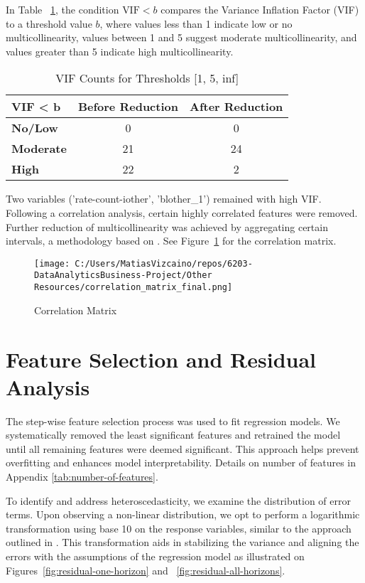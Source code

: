 \documentclass{article}
\begin{document}
In Table ~\ref{fig:VIF-analysis}, the condition \( \text{VIF} < b \) compares the Variance Inflation Factor (VIF) to a threshold value \( b \), where values less than 1 indicate low or no multicollinearity, values between 1 and 5 suggest moderate multicollinearity, and values greater than 5 indicate high multicollinearity.

\begin{table}[h]
\centering
\begin{tabular}{lcc}
\hline
 VIF \textless{} b & \textbf{Before Reduction} & \textbf{After Reduction} \\
\hline
\textbf{No/Low} & 0 & 0 \\
\textbf{Moderate} & 21 & 24 \\
\textbf{High} & 22 & 2 \\
\hline
\end{tabular}
\caption{VIF Counts for Thresholds [1, 5, inf]}
\label{fig:VIF-analysis}
\end{table}

Two variables ('rate-count-iother', 'blother\_1') remained with high VIF. Following a correlation analysis, certain highly correlated features were removed. Further reduction of multicollinearity was achieved by aggregating certain intervals, a methodology based on \cite{Miori2023}. See Figure~\ref{fig:correlation-matrix} for the correlation matrix.

\begin{figure}[htbp]
  \centering
  \texttt{[image: C:/Users/MatiasVizcaino/repos/6203-DataAnalyticsBusiness-Project/Other Resources/correlation\_matrix\_final.png]}
  \caption{Correlation Matrix}
  \label{fig:correlation-matrix}
\end{figure}

\section{\textbf{Feature Selection and Residual Analysis}}

The step-wise feature selection process was used to fit regression models. We systematically removed the least significant features and retrained the model until all remaining features were deemed significant. This approach helps prevent overfitting and enhances model interpretability. Details on number of features in Appendix \ref{tab:number-of-features}.

To identify and address heteroscedasticity, we examine the distribution of error terms. Upon observing a non-linear distribution, we opt to perform a logarithmic transformation using base 10 on the response variables, similar to the approach outlined in \cite{Miori2023}. This transformation aids in stabilizing the variance and aligning the errors with the assumptions of the regression model as illustrated on Figures~\ref{fig:residual-one-horizon} and ~\ref{fig:residual-all-horizons}.
\end{document}
